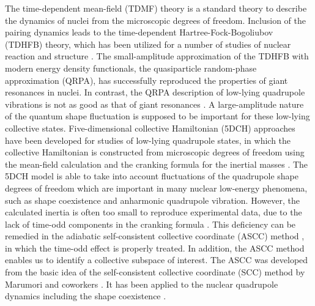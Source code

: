 \documentclass[%
superscriptaddress,
showpacs,
nofootinbib,
amsmath,amssymb,
aps,
prc,
twocolumn,
floatfix ]%
{revtex4-1}
\begin{document}
The time-dependent mean-field (TDMF) theory is a standard theory to describe
the dynamics of nuclei from the microscopic degrees of freedom.
Inclusion of the pairing dynamics leads to the
time-dependent Hartree-Fock-Bogoliubov (TDHFB) theory,
which has been utilized for a number of studies of nuclear reaction
and structure \cite{NMMY16}.
The small-amplitude approximation of the TDHFB with modern energy density
functionals, the quasiparticle random-phase approximation (QRPA), 
has successfully reproduced the properties of giant resonances in nuclei.
In contrast, the QRPA description of low-lying quadrupole vibrations
is not as good as that of giant resonances \cite{NMMY16}.
A large-amplitude nature of the quantum shape fluctuation is supposed to
be important for these low-lying collective states.
Five-dimensional collective Hamiltonian (5DCH) approaches
have been developed for studies of low-lying quadrupole states,
in which the collective Hamiltonian is constructed from
microscopic degrees of freedom using the mean-field calculation and
the cranking formula for the inertial masses \cite{Bar11,Del10,Fu13}.
The 5DCH model is able to take into account fluctuations of
the quadrupole shape degrees of freedom which are important in many
nuclear low-energy phenomena, such as
shape coexistence and anharmonic quadrupole vibration.
However, the calculated inertia is often too small to reproduce
experimental data, due to the lack of time-odd components
in the cranking formula \cite{RS80}.
This deficiency can be remedied in the adiabatic self-consistent collective
coordinate (ASCC) method \cite{MNM00},
in which the time-odd effect is properly treated.
In addition, the ASCC method enables us to identify a collective subspace
of interest.
The ASCC was developed from the basic idea of the self-consistent
collective coordinate (SCC) method by Marumori and coworkers \cite{MMSK80}.
It has been applied to the nuclear quadrupole dynamics including
the shape coexistence \cite{KNMM05, HNMM08, HNMM09}.
\end{document}
